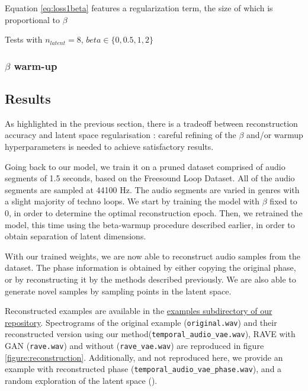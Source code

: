 \documentclass{article}
\begin{document}
Equation \eqref{eq:loss1beta} features a regularization term, the size of which is proportional to $\beta$ 

Tests with $n_{latent} = 8$, $beta \in \{0, 0.5, 1, 2\}$



\subsubsection{$\beta$ warm-up}





\subsection{Results}




As highlighted in the previous section, there is a tradeoff between reconstruction accuracy and latent space regularisation : careful refining of the $\beta$ and/or warmup hyperparameters is needed to achieve satisfactory results.

Going back to our model, we train it on a pruned dataset comprised of audio segments of 1.5 seconds, based on the Freesound Loop Dataset\cite{ramires2020}. All of the audio segments are sampled at 44100 Hz. The audio segments are varied in genres with a slight majority of techno loops.
We start by training the model with $\beta$ fixed to 0, in order to determine the optimal reconstruction epoch. Then, we retrained the model, this time using the beta-warmup procedure described earlier, in order to obtain separation of latent dimensions.

With our trained weights, we are now able to reconstruct audio samples from the dataset. The phase information is obtained by either copying the original phase, or by reconstructing it by the methods described previously. We are also able to generate novel samples by sampling points in the latent space.

Reconstructed examples are available in the \href{https://github.com/estevep/Temporal-Audio-VAE/tree/main/examples}{examples subdirectory of our repository}. Spectrograms of the original example (\verb|original.wav|) and their reconstructed version using our method(\verb|temporal_audio_vae.wav|), RAVE with GAN (\verb|rave.wav|) and without (\verb|rave_vae.wav|) are reproduced in figure \ref{figure:reconstruction}. Additionally, and not reproduced here, we provide an example with reconstructed phase (\verb|temporal_audio_vae_phase.wav|), and a random exploration of the latent space (\verb||).
\end{document}
